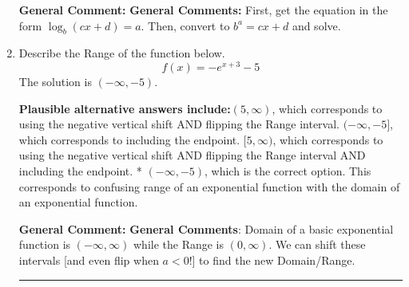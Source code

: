 \documentclass{extbook}[14pt]
\newcommand{\litem}[1]{\item #1

\rule{\textwidth}{0.4pt}}
\begin{document}
\begin{enumerate}
{\textbf{General Comment:} \textbf{General Comments:} First, get the equation in the form $\log_b{(cx+d)} = a$. Then, convert to $b^a = cx+d$ and solve.
}
\litem{
Describe the Range of the function below.
\[ f(x) = -e^{x+3}-5 \]The solution is \( (-\infty, -5) \).\begin{enumerate}[label=\Alph*.]
\textbf{Plausible alternative answers include:}$(5, \infty)$, which corresponds to using the negative vertical shift AND flipping the Range interval.
$(-\infty, -5]$, which corresponds to including the endpoint.
$[5, \infty)$, which corresponds to using the negative vertical shift AND flipping the Range interval AND including the endpoint.
* $(-\infty, -5)$, which is the correct option.
This corresponds to confusing range of an exponential function with the domain of an exponential function.
\end{enumerate}

\textbf{General Comment:} \textbf{General Comments}: Domain of a basic exponential function is $(-\infty, \infty)$ while the Range is $(0, \infty)$. We can shift these intervals [and even flip when $a<0$!] to find the new Domain/Range.
}
\end{enumerate}
\end{document}
